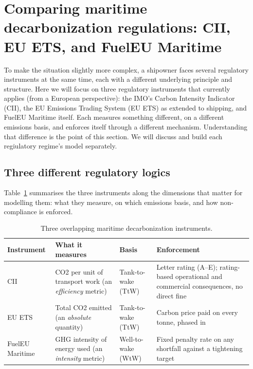 \section{Comparing maritime decarbonization regulations: CII, EU ETS, and FuelEU Maritime}
\label{sec:regimes}

To make the situation slightly more complex, a shipowner faces several regulatory instruments at the same time, each with a 
different underlying principle and structure. Here we will focus on three
regulatory instruments that currently applies (from a European perspective): the IMO's Carbon Intensity Indicator (CII), the EU
Emissions Trading System (EU ETS) as extended to shipping, and FuelEU
Maritime itself. Each measures something different, on a different
emissions basis, and enforces itself through a different mechanism.
Understanding that difference is
the point of this section. We will discuss and build each regiulatory regime's model separately.

\subsection{Three different regulatory logics}
\label{sec:regimes-logics}

Table~\ref{tab:regime-comparison} summarises the three instruments along
the dimensions that matter for modelling them: what they measure, on
which emissions basis, and how non-compliance is enforced.

\begin{table}[htbp]
\centering
\caption{Three overlapping maritime decarbonization instruments.}
\label{tab:regime-comparison}
\begin{tabular}{@{}p{}p{}p{}p{}@{}}
\toprule
Instrument & What it measures & Basis & Enforcement \\
\midrule
CII & CO2 per unit of transport work (an \emph{efficiency} metric) & Tank-to-wake (TtW) & Letter rating (A--E); rating-based operational and commercial consequences, no direct fine \\
EU ETS & Total CO2 emitted (an \emph{absolute} quantity) & Tank-to-wake (TtW) & Carbon price paid on every tonne, phased in \\
FuelEU Maritime & GHG intensity of energy used (an \emph{intensity} metric) & Well-to-wake (WtW) & Fixed penalty rate on any shortfall against a tightening target \\
\bottomrule
\end{tabular}
\end{table}

